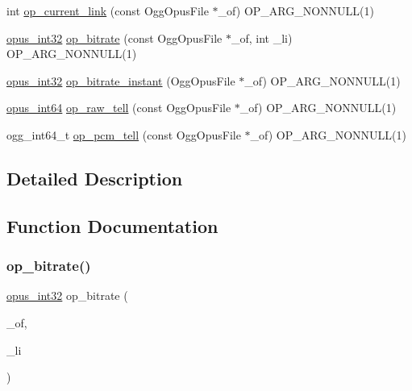 \begin{DoxyCompactItemize}
\item 
int \mbox{\hyperlink{group__stream__info_gabd97a260a6740ea7c2c59ca9ecd592bf}{op\+\_\+current\+\_\+link}} (const Ogg\+Opus\+File $\ast$\+\_\+of) O\+P\+\_\+\+A\+R\+G\+\_\+\+N\+O\+N\+N\+U\+LL(1)
\item 
\mbox{\hyperlink{opus__types_8h_aa4d309d6f80b99dbabebc8f98879ab9a}{opus\+\_\+int32}} \mbox{\hyperlink{group__stream__info_ga2778b161df6d07abdd642f1a4802cc1c}{op\+\_\+bitrate}} (const Ogg\+Opus\+File $\ast$\+\_\+of, int \+\_\+li) O\+P\+\_\+\+A\+R\+G\+\_\+\+N\+O\+N\+N\+U\+LL(1)
\item 
\mbox{\hyperlink{opus__types_8h_aa4d309d6f80b99dbabebc8f98879ab9a}{opus\+\_\+int32}} \mbox{\hyperlink{group__stream__info_ga7e9e871615055673d5e3c7b4c1dfce80}{op\+\_\+bitrate\+\_\+instant}} (Ogg\+Opus\+File $\ast$\+\_\+of) O\+P\+\_\+\+A\+R\+G\+\_\+\+N\+O\+N\+N\+U\+LL(1)
\item 
\mbox{\hyperlink{opus__types_8h_ab6742070cf9d0ccffca2b80522b4f41a}{opus\+\_\+int64}} \mbox{\hyperlink{group__stream__info_gab857684ab149c6225884ad94c3787561}{op\+\_\+raw\+\_\+tell}} (const Ogg\+Opus\+File $\ast$\+\_\+of) O\+P\+\_\+\+A\+R\+G\+\_\+\+N\+O\+N\+N\+U\+LL(1)
\item 
ogg\+\_\+int64\+\_\+t \mbox{\hyperlink{group__stream__info_gae07b8e40d883cd2a43edfec8c5bfa205}{op\+\_\+pcm\+\_\+tell}} (const Ogg\+Opus\+File $\ast$\+\_\+of) O\+P\+\_\+\+A\+R\+G\+\_\+\+N\+O\+N\+N\+U\+LL(1)
\end{DoxyCompactItemize}


\subsection{Detailed Description}


\subsection{Function Documentation}
\mbox{\label{group__stream__info_ga2778b161df6d07abdd642f1a4802cc1c}} 
\subsubsection{\texorpdfstring{op\_bitrate()}{op\_bitrate()}}
{\footnotesize\ttfamily \mbox{\hyperlink{opus__types_8h_aa4d309d6f80b99dbabebc8f98879ab9a}{opus\+\_\+int32}} op\+\_\+bitrate (\begin{DoxyParamCaption}\item[{const Ogg\+Opus\+File $\ast$}]{\+\_\+of,  }\item[{int}]{\+\_\+li }\end{DoxyParamCaption})}

